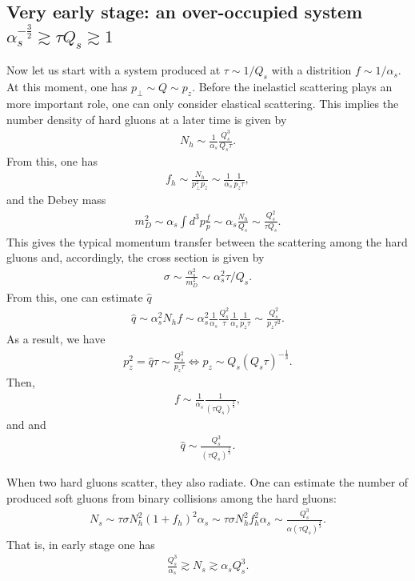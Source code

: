 \documentclass[onecolumn,showpacs,nobibnotes,nofootinbib,12pt]{revtex4-1}
\begin{document}
\subsection{Very early stage: an over-occupied system $\alpha_s^{-\frac{3}{2}}\gtrsim \tau Q_s \gtrsim 1$}
%
Now let us start with a system produced at $\tau\sim 1/Q_s$ with a distrition $f\sim 1/\alpha_s$. At this moment, one has $p_\perp\sim Q\sim p_z$. Before the inelasticl scattering  plays an more important role, one can only consider elastical scattering. This implies the number density of  hard gluons at a later time is given by
\begin{eqnarray}
  N_h\sim \frac{1}{\alpha_s}\frac{Q_s^3}{Q_s\tau}.
\end{eqnarray}
From this, one has
\begin{eqnarray}
  f_h\sim \frac{N_h}{p_\perp^2 p_z}\sim \frac{1}{\alpha_s}\frac{1}{p_z \tau},
\end{eqnarray}
and the Debey mass
\begin{eqnarray}
  m_D^2\sim \alpha_s \int d^3p \frac{f}{p}\sim \alpha_s \frac{N_h}{Q_s}\sim \frac{Q_s^2}{\tau Q_s}.
\end{eqnarray}
This gives the typical momentum transfer between the scattering among the hard gluons and, accordingly, the cross section  is given by
\begin{eqnarray}
  \sigma\sim \frac{\alpha_s^2}{m_D^2}\sim \alpha_s^2 \tau/Q_s.
\end{eqnarray}
From this, one can estimate $\hat{q}$
\begin{eqnarray}
  \hat{q}\sim \alpha_s^2 N_h f\sim \alpha_s^2 \frac{1}{\alpha_s} \frac{Q_s^2}{\tau} \frac{1}{\alpha_s}\frac{1}{p_z \tau}\sim \frac{Q_s^2}{p_z \tau^2}.
\end{eqnarray}
As a result, we have
\begin{eqnarray}
p_z^2=\hat{q}\tau\sim \frac{Q_s^2}{p_z \tau}\Leftrightarrow p_z\sim Q_s (Q_s\tau)^{-\frac{1}{3}}.
\end{eqnarray}
Then,
\begin{eqnarray}
f\sim \frac{1}{\alpha_s}\frac{1}{(\tau Q_s)^\frac{2}{3}},
\end{eqnarray}
and
and
\begin{eqnarray}
\hat{q}\sim \frac{Q_s^3}{(\tau Q_s)^{\frac{5}{3}}}.
\end{eqnarray}


When two hard gluons scatter, they also radiate. One can estimate the number of produced soft gluons from binary collisions among the hard gluons:
\begin{eqnarray}
N_s\sim \tau \sigma N_h^2 (1+f_h)^2 \alpha_s \sim \tau \sigma N_h^2 f_h^2 \alpha_s\sim \frac{Q_s^3}{\alpha (\tau Q_s)^\frac{4}{3}}.
\end{eqnarray}
That is, in early stage one has
\begin{eqnarray}
\frac{Q_s^3}{\alpha_s}\gtrsim N_s \gtrsim \alpha_s Q_s^3.
\end{eqnarray}
\end{document}
